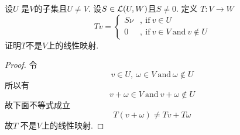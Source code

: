 \begin{problem}{10}
  设$U$ 是$V$的子集且$U\neq V$.
  设$S\in\mathcal{L}(U,W)$且$S\neq 0$.
  定义 $T:V\rightarrow W$
  \begin{equation}
    Tv=\left\{
      \begin{aligned}
        S\nu &, \ \mathrm{if}\ v\in U \\
        0 &,\ \mathrm{if}\ v\in V\ \mathrm{and}\ v\notin U
      \end{aligned}
    \right.
  \end{equation}
  证明$T$不是$V$上的线性映射.
\end{problem} 


\begin{proof}
  令
  $$v\in U,\ \omega\in V \ \mathrm{and} \ \omega \notin U $$
  所以有
  \begin{displaymath}
    v+\omega \in V\ \mathrm{and} \ v+\omega \notin U  
  \end{displaymath}
  故下面不等式成立
  \begin{displaymath}
    T(v+\omega) \neq Tv+T\omega
  \end{displaymath}
  故$T$ 不是$V$上的线性映射.
\end{proof}
